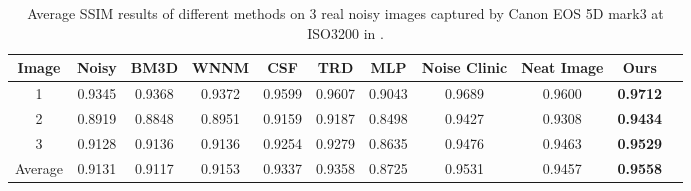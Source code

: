 \documentclass[10pt,twocolumn,letterpaper]{article}
\begin{document}
\begin{table}
\caption{Average SSIM results of different methods on 3 real noisy images captured by Canon EOS 5D mark3 at ISO3200 in \cite{crosschannel2016}.}
\label{tab1}
\begin{center}
\renewcommand\arraystretch{1}
\begin{tabular}{|c||c|c|c|c|c|c|c|c|c|c|}
\hline
Image & \textbf{Noisy} &\textbf{BM3D}&\textbf{WNNM}&\textbf{CSF}&\textbf{TRD}&\textbf{MLP}& \textbf{Noise Clinic}& \textbf{Neat Image}&\textbf{Ours}
\\
\hline
1& 0.9345 & 0.9368  & 0.9372  & 0.9599   &  0.9607  & 0.9043   &  0.9689  & 0.9600   &\textbf{ 0.9712  }
\\
\hline
2& 0.8919 &  0.8848 &  0.8951 & 0.9159   &  0.9187  &  0.8498  &  0.9427  &  0.9308  & \textbf{ 0.9434 }
\\
\hline
3& 0.9128  & 0.9136 & 0.9136  & 0.9254   &  0.9279  &  0.8635  &  0.9476  & 0.9463   & \textbf{ 0.9529 }
\\
\hline
Average &  0.9131  & 0.9117 &  0.9153 & 0.9337   & 0.9358   &  0.8725  & 0.9531   & 0.9457   &  \textbf{0.9558} 
\\
\hline
\end{tabular}
\end{center}
\end{table}
\end{document}
